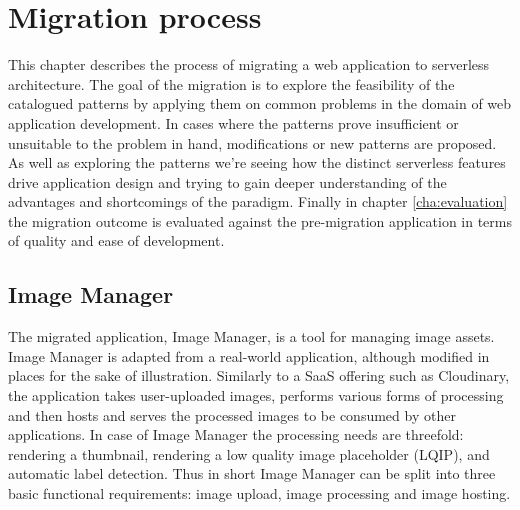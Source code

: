 \chapter{Migration process}

This chapter describes the process of migrating a web application to serverless architecture. The goal of the migration is to explore the feasibility of the catalogued patterns by applying them on common problems in the domain of web application development. In cases where the patterns prove insufficient or unsuitable to the problem in hand, modifications or new patterns are proposed. As well as exploring the patterns we're seeing how the distinct serverless features drive application design and trying to gain deeper understanding of the advantages and shortcomings of the paradigm. Finally in chapter \ref{cha:evaluation} the migration outcome is evaluated against the pre-migration application in terms of quality and ease of development.


\section{Image Manager}

The migrated application, Image Manager, is a tool for managing image assets. Image Manager is adapted from a real-world application, although modified in places for the sake of illustration. Similarly to a SaaS offering such as Cloudinary, the application takes user-uploaded images, performs various forms of processing and then hosts and serves the processed images to be consumed by other applications. In case of Image Manager the processing needs are threefold: rendering a thumbnail, rendering a low quality image placeholder (LQIP), and automatic label detection. Thus in short Image Manager can be split into three basic functional requirements: image upload, image processing and image hosting.

